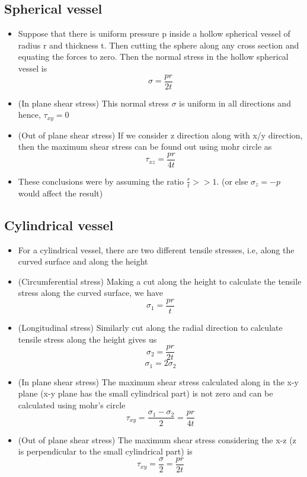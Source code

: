 \documentclass{article}
\begin{document}
	\subsection{Spherical vessel}
	\begin{itemize}
		\item Suppose that there is uniform pressure p inside a hollow spherical vessel of radius r and thickness t. Then cutting the sphere along any cross section and equating the forces to zero. Then the normal stress in the hollow spherical vessel is
		\[\sigma = \frac{pr}{2t}\]
		\item (In plane shear stress) This normal stress $\sigma$ is uniform in all directions and hence, $\tau_{xy} = 0$
		\item (Out of plane shear stress) If we consider z direction along with x/y direction, then the maximum shear stress can be found out using mohr circle as 
		\[\tau_{xz} = \frac{pr}{4t}\]

		\item These conclusions were by assuming the ratio $\frac{r}{t} >> 1$. (or else $\sigma_z = -p$ would affect the result)
	\end{itemize}


	\subsection{Cylindrical vessel}
	\begin{itemize}
		\item For a cylindrical vessel, there are two different tensile stresses, i.e, along the curved surface and along the height
		\item (Circumferential stress) Making a cut along the height to calculate the tensile stress along the curved surface, we have
			\[\sigma_1 = \frac{pr}{t}\]

		\item (Longitudinal stress) Similarly cut along the radial direction to calculate tensile stress along the height gives us
			\[\sigma_2 = \frac{pr}{2t}\]
			\[\sigma_1 = 2 \sigma_2\]

		\item (In plane shear stress) The maximum shear stress calculated along in the x-y plane (x-y plane has the small cylindrical part) is not zero and can be calculated using mohr's circle
			\[\tau_{xy} = \frac{\sigma_1 - \sigma_2}{2} = \frac{pr}{4t}\]

		\item (Out of plane shear stress) The maximum shear stress considering the x-z (z is perpendicular to the small cylindrical part) is 
			\[\tau_{xy} = \frac{\sigma}{2} = \frac{pr}{2t}\]

	\end{itemize}
\end{document}
